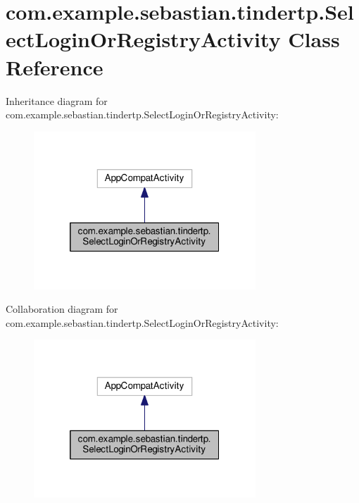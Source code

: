 \hypertarget{classcom_1_1example_1_1sebastian_1_1tindertp_1_1SelectLoginOrRegistryActivity}{}\section{com.\+example.\+sebastian.\+tindertp.\+Select\+Login\+Or\+Registry\+Activity Class Reference}
\label{classcom_1_1example_1_1sebastian_1_1tindertp_1_1SelectLoginOrRegistryActivity}


Inheritance diagram for com.\+example.\+sebastian.\+tindertp.\+Select\+Login\+Or\+Registry\+Activity\+:\nopagebreak
\begin{figure}[H]
\begin{center}
\leavevmode
\includegraphics[width=236pt]{classcom_1_1example_1_1sebastian_1_1tindertp_1_1SelectLoginOrRegistryActivity__inherit__graph}
\end{center}
\end{figure}


Collaboration diagram for com.\+example.\+sebastian.\+tindertp.\+Select\+Login\+Or\+Registry\+Activity\+:\nopagebreak
\begin{figure}[H]
\begin{center}
\leavevmode
\includegraphics[width=236pt]{classcom_1_1example_1_1sebastian_1_1tindertp_1_1SelectLoginOrRegistryActivity__coll__graph}
\end{center}
\end{figure}
